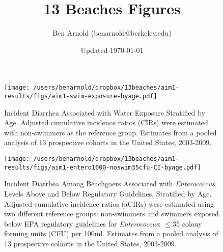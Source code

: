 \documentclass[11pt]{article}
\title{13 Beaches Figures}
\author{Ben Arnold (benarnold@berkeley.edu)}
\date{Updated \today}
\begin{document}
\begin{landscape}
\begin{figure}[htbp]
\begin{center}
\texttt{[image: /users/benarnold/dropbox/13beaches/aim1-results/figs/aim1-swim-exposure-byage.pdf]}
\begin{minipage}{1.2\textwidth}
\caption{Incident Diarrhea Associated with Water Exposure Stratified by Age. Adjusted cumulative incidence ratios (CIRs) were estimated with non-swimmers as the reference group. Estimates from a pooled analysis of 13 prospective cohorts in the United States, 2003-2009.}
\label{fig:swimex}
\end{minipage}
\end{center}
\end{figure}
\end{landscape}

\begin{landscape}
\begin{figure}[htbp]
\begin{center}
\texttt{[image: /users/benarnold/dropbox/13beaches/aim1-results/figs/aim1-entero1600-noswim35cfu-CI-byage.pdf]} \\
\begin{minipage}{1.2\textwidth}
\caption{Incident Diarrhea Among Beachgoers Associated with \textit{Enterococcus} Levels Above and Below Regulatory Guidelines, Stratified by Age. Adjusted cumulative incidence ratios (aCIRs) were estimated using two different reference groups: non-swimmers and swimmers exposed below EPA regulatory guidelines for \textit{Enterococcus}: $\leq$35 colony forming units (CFU) per 100ml. Estimates from a pooled analysis of 13 prospective cohorts in the United States, 2003-2009. }
\label{fig:enteroregulatory}
\end{minipage}
\end{center}
\end{figure}
\end{landscape}
\end{document}
